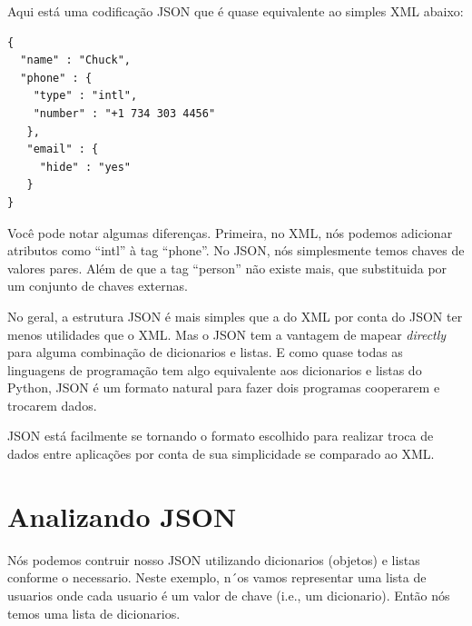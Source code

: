 Aqui está uma codificação JSON que é quase equivalente ao simples XML abaixo:

\beforeverb
\begin{verbatim}
{
  "name" : "Chuck",
  "phone" : {
    "type" : "intl",
    "number" : "+1 734 303 4456"
   },
   "email" : {
     "hide" : "yes"
   }
}
\end{verbatim}
\afterverb
%
Você pode notar algumas diferenças. Primeira, no XML, nós podemos adicionar
atributos como ``intl'' à tag ``phone''. No JSON, nós simplesmente temos chaves de
valores pares. Além de que a tag ``person'' não existe mais, que substituida por
um conjunto de chaves externas.

No geral, a estrutura JSON é mais simples que a do XML por conta do JSON ter menos
utilidades que o XML. Mas o JSON tem a vantagem de mapear {\em directly} para alguma
combinação de dicionarios e listas. E como quase todas as linguagens de programação 
tem algo equivalente aos dicionarios e listas do Python, JSON é um formato natural 
para fazer dois programas cooperarem e trocarem dados.

JSON está facilmente se tornando o formato escolhido para realizar troca de dados
entre aplicações por conta de sua simplicidade se comparado ao XML.

\section{Analizando JSON}

Nós podemos contruir nosso JSON utilizando dicionarios (objetos) e listas conforme
o necessario. Neste exemplo, n´os vamos representar uma lista de usuarios onde cada
usuario é um valor de chave (i.e., um dicionario). Então nós temos uma lista de
dicionarios.

